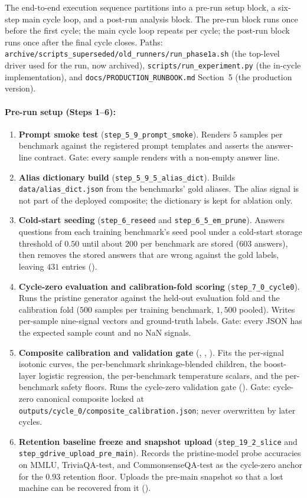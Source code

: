 The end-to-end execution sequence partitions into a pre-run setup block, a six-step main cycle loop, and a post-run analysis block. The pre-run block runs once before the first cycle; the main cycle loop repeats per cycle; the post-run block runs once after the final cycle closes. Paths: \verb|archive/scripts_superseded/old_runners/run_phase1a.sh| (the top-level driver used for the run, now archived), \verb|scripts/run_experiment.py| (the in-cycle implementation), and \verb|docs/PRODUCTION_RUNBOOK.md| Section~5 (the production version).

\paragraph{Pre-run setup (Steps 1--6):}
\begin{enumerate}
\item \textbf{Prompt smoke test} (\verb|step_5_9_prompt_smoke|). Renders $5$ samples per benchmark against the registered prompt templates and asserts the answer-line contract. Gate: every sample renders with a non-empty answer line.
\item \textbf{Alias dictionary build} (\verb|step_5_9_5_alias_dict|). Builds \verb|data/alias_dict.json| from the benchmarks' gold aliases. The alias signal is not part of the deployed composite; the dictionary is kept for ablation only.
\item \textbf{Cold-start seeding} (\verb|step_6_reseed| and \verb|step_6_5_em_prune|). Answers questions from each training benchmark's seed pool under a cold-start storage threshold of $0.50$ until about $200$ per benchmark are stored ($603$ answers), then removes the stored answers that are wrong against the gold labels, leaving $431$ entries ().
\item \textbf{Cycle-zero evaluation and calibration-fold scoring} (\verb|step_7_0_cycle0|). Runs the pristine generator against the held-out evaluation fold and the calibration fold ($500$ samples per training benchmark, $1{,}500$ pooled). Writes per-sample nine-signal vectors and ground-truth labels. Gate: every JSON has the expected sample count and no NaN signals.
\item \textbf{Composite calibration and validation gate} (, , ). Fits the per-signal isotonic curves, the per-benchmark shrinkage-blended children, the boost-layer logistic regression, the per-benchmark temperature scalars, and the per-benchmark safety floors. Runs the cycle-zero validation gate (). Gate: cycle-zero canonical composite locked at \verb|outputs/cycle_0/composite_calibration.json|; never overwritten by later cycles.
\item \textbf{Retention baseline freeze and snapshot upload} (\verb|step_19_2_slice| and \verb|step_gdrive_upload_pre_main|). Records the pristine-model probe accuracies on MMLU, TriviaQA-test, and CommonsenseQA-test as the cycle-zero anchor for the $0.93$ retention floor. Uploads the pre-main snapshot so that a lost machine can be recovered from it ().
\end{enumerate}

